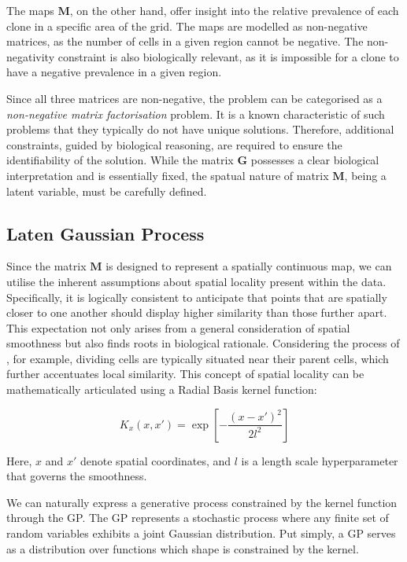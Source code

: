 The maps $\mathbf{M}$, on the other hand, offer insight into the relative prevalence of each clone in a specific area of the grid. The maps are modelled as non-negative matrices, as the number of cells in a given region cannot be negative. The non-negativity constraint is also biologically relevant, as it is impossible for a clone to have a negative prevalence in a given region.

Since all three matrices are non-negative, the problem can be categorised as a \emph{non-negative matrix factorisation} problem. It is a known characteristic of such problems that they typically do not have unique solutions. Therefore, additional constraints, guided by biological reasoning, are required to ensure the identifiability of the solution. While the matrix $\mathbf{G}$ possesses a clear biological interpretation and is essentially fixed, the spatual nature of matrix $\mathbf{M}$, being a latent variable, must be carefully defined.

\subsection{Laten Gaussian Process}

Since the matrix $\mathbf{M}$ is designed to represent a spatially continuous map, we can utilise the inherent assumptions about spatial locality present within the data. Specifically, it is logically consistent to anticipate that points that are spatially closer to one another should display higher similarity than those further apart. This expectation not only arises from a general consideration of spatial smoothness but also finds roots in biological rationale. Considering the process of , for example, dividing cells are typically situated near their parent cells, which further accentuates local similarity. This concept of spatial locality can be mathematically articulated using a Radial Basis kernel function:

\begin{equation}
    K_x(x,x') = \exp\left[ -\dfrac{(x-x')^2}{2l^2}\right]
\end{equation}

Here, $x$ and $x'$ denote spatial coordinates, and $l$ is a length scale hyperparameter that governs the smoothness.

We can naturally express a generative process constrained by the kernel function through the \acf{GP}. The \ac{GP} represents a stochastic process where any finite set of random variables exhibits a joint Gaussian distribution. Put simply, a \ac{GP} serves as a distribution over functions which shape is constrained by the kernel. 

